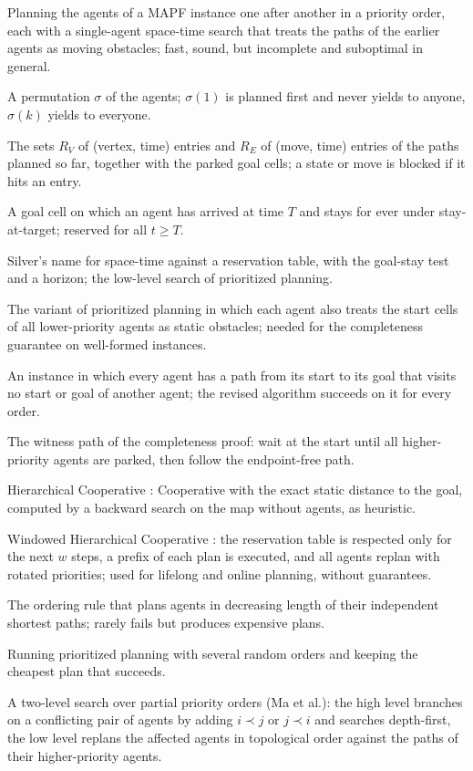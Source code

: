 \item[Prioritized planning] Planning the agents of a MAPF instance one after another in a priority order, each with a single-agent space-time search that treats the paths of the earlier agents as moving obstacles; fast, sound, but incomplete and suboptimal in general.
\item[Priority order] A permutation $\sigma$ of the agents; $\sigma(1)$ is planned first and never yields to anyone, $\sigma(k)$ yields to everyone.
\item[Reservation table] The sets $R_V$ of (vertex, time) entries and $R_E$ of (move, time) entries of the paths planned so far, together with the parked goal cells; a state or move is blocked if it hits an entry.
\item[Parked goal] A goal cell on which an agent has arrived at time $T$ and stays for ever under stay-at-target; reserved for all $t \ge T$.
\item[Cooperative A*] Silver's name for space-time \astar against a reservation table, with the goal-stay test and a horizon; the low-level search of prioritized planning.
\item[Revised rule] The variant of prioritized planning in which each agent also treats the start cells of all lower-priority agents as static obstacles; needed for the completeness guarantee on well-formed instances.
\item[Well-formed instance] An instance in which every agent has a path from its start to its goal that visits no start or goal of another agent; the revised algorithm succeeds on it for every order.
\item[Wait-then-go path] The witness path of the completeness proof: wait at the start until all higher-priority agents are parked, then follow the endpoint-free path.
\item[HCA*] Hierarchical Cooperative \astar: Cooperative \astar with the exact static distance to the goal, computed by a backward search on the map without agents, as heuristic.
\item[WHCA*] Windowed Hierarchical Cooperative \astar: the reservation table is respected only for the next $w$ steps, a prefix of each plan is executed, and all agents replan with rotated priorities; used for lifelong and online planning, without guarantees.
\item[Longest path first] The ordering rule that plans agents in decreasing length of their independent shortest paths; rarely fails but produces expensive plans.
\item[Random restarts] Running prioritized planning with several random orders and keeping the cheapest plan that succeeds.
\item[Priority-based search] A two-level search over partial priority orders (Ma et al.): the high level branches on a conflicting pair of agents by adding $i \prec j$ or $j \prec i$ and searches depth-first, the low level replans the affected agents in topological order against the paths of their higher-priority agents.
